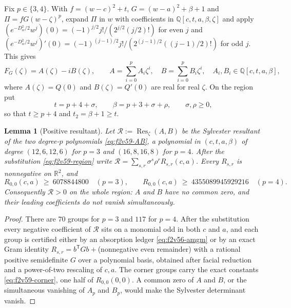 \documentclass[11pt]{article}
\newtheorem{lemma}[theorem]{Lemma}
\theoremstyle{definition}
\theoremstyle{remark}
\begin{document}
Fix \(p\in\{3,4\}\).  With \(f=(w-c)^2+t\), \(G=(w-a)^2+\beta+1\) and
\(\Pi=fG(w-\zeta)^p\), expand \(\Pi\) in \(w\) with coefficients in
\(\mathbb Q[c,t,a,\beta,\zeta]\) and apply
\((e^{-D_w^2/2}w^j)(0)=(-1)^{j/2}j!/(2^{j/2}(j/2)!)\) for even \(j\) and
\((e^{-D_w^2/2}w^j)'(0)=(-1)^{(j-1)/2}j!/(2^{(j-1)/2}((j-1)/2)!)\) for
odd \(j\).  This gives
\begin{equation}
 F_G(\zeta)=A(\zeta)-iB(\zeta),\qquad
 A=\sum_{i=0}^pA_i\zeta^i,\quad B=\sum_{i=0}^pB_i\zeta^i,\quad
 A_i,B_i\in\mathbb Q[c,t,a,\beta],
 \label{eq:f2v59-AB}
\end{equation}
where \(A(\zeta)=Q(0)\) and \(B(\zeta)=Q'(0)\) are real for real
\(\zeta\).  On the region put
\begin{equation}
 t=p+4+\sigma,\qquad \beta=p+3+\sigma+\rho,\qquad \sigma,\rho\ge0,
 \label{eq:f2v59-region}
\end{equation}
so that \(t\ge p+4\) and \(t_2=\beta+1\ge t\).

\begin{lemma}[Positive resultant]
\label{lem:f2v59-resultant}
Let \(\mathcal R:=\operatorname{Res}_\zeta(A,B)\) be the Sylvester
resultant of the two degree-\(p\) polynomials \eqref{eq:f2v59-AB}, a
polynomial in \((c,t,a,\beta)\) of degree \((12,6,12,6)\) for \(p=3\)
and \((16,8,16,8)\) for \(p=4\).  After the substitution
\eqref{eq:f2v59-region} write
\(\mathcal R=\sum_{s,r}\sigma^s\rho^rR_{s,r}(c,a)\).  Every
\(R_{s,r}\) is nonnegative on \(\mathbb R^2\), and
\begin{equation}
 R_{0,0}(c,a)\ \ge\ 6078844800\quad(p=3),\qquad
 R_{0,0}(c,a)\ \ge\ 4355089945929216\quad(p=4).
 \label{eq:f2v59-corner}
\end{equation}
Consequently \(\mathcal R>0\) on the whole region: \(A\) and \(B\) have
no common zero, and their leading coefficients do not vanish
simultaneously.
\end{lemma}

\begin{proof}
There are \(70\) groups for \(p=3\) and \(117\) for \(p=4\).  After the
substitution every negative coefficient of \(\mathcal R\) sits on a
monomial odd in both \(c\) and \(a\), and each group is certified either
by an absorption ledger \eqref{eq:f2v56-amgm} or by an exact
Gram identity \(R_{s,r}=b^{\mathsf T}Gb+\)(nonnegative even remainder)
with a rational positive semidefinite \(G\) over a polynomial basis,
obtained after facial reduction and a power-of-two rescaling of
\(c,a\).  The corner groups carry the exact constants
\eqref{eq:f2v59-corner}, one half of \(R_{0,0}(0,0)\).  A common zero of
\(A\) and \(B\), or the simultaneous vanishing of \(A_p\) and \(B_p\),
would make the Sylvester determinant vanish.
\end{proof}
\end{document}
